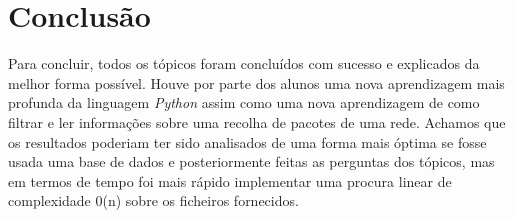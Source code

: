 \chapter{Conclusão}

Para concluir, todos os tópicos foram concluídos com sucesso e explicados da melhor forma possível. Houve por parte dos alunos uma nova aprendizagem mais profunda da linguagem \textit{Python} assim como uma nova aprendizagem de como filtrar e ler informações sobre uma recolha de pacotes de uma rede. Achamos que os resultados poderiam ter sido analisados de uma forma mais óptima se fosse usada uma base de dados e posteriormente feitas as perguntas dos tópicos, mas em termos de tempo foi mais rápido implementar uma procura linear de complexidade 0(n) sobre os ficheiros fornecidos.